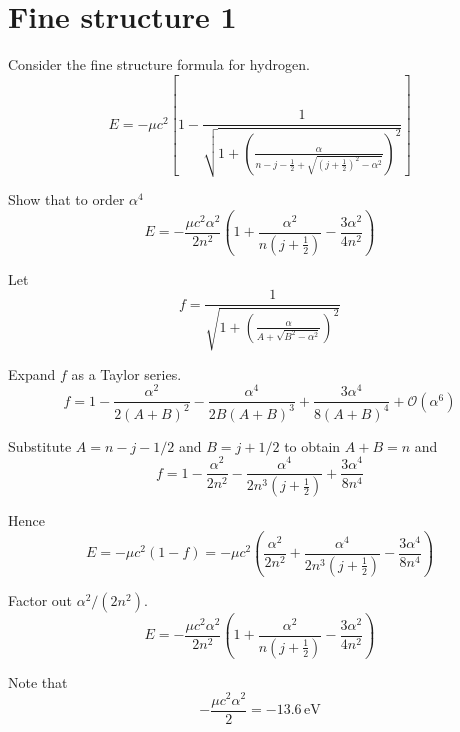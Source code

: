 

\section*{Fine structure 1}

Consider the fine structure formula for hydrogen.
\begin{equation*}
E=-\mu c^2\left[1-\frac{1}{\sqrt{\displaystyle1
+\left(\frac{\alpha}{n-j-\frac{1}{2}+\sqrt{\left(j+\frac{1}{2}\right)^2-\alpha^2}}\right)^2}}\right]
\end{equation*}

Show that to order $\alpha^4$
\begin{equation*}
E=-\frac{\mu c^2\alpha^2}{2n^2}
\left(1+\frac{\alpha^2}{n\left(j+\frac{1}{2}\right)}-\frac{3\alpha^2}{4n^2}\right)
\end{equation*}

Let
\begin{equation*}
f=\frac{1}{\sqrt{\displaystyle1+\left(\frac{\alpha}{A+\sqrt{B^2-\alpha^2}}\right)^2}}
\end{equation*}

Expand $f$ as a Taylor series.
\begin{equation*}
f=1-\frac{\alpha^2}{2(A+B)^2}-\frac{\alpha^4}{2B(A+B)^3}+\frac{3\alpha^4}{8(A+B)^4}+\mathcal O(\alpha^6)
\end{equation*}

Substitute $A=n-j-1/2$ and $B=j+1/2$ to obtain $A+B=n$ and
\begin{equation*}
f=1-\frac{\alpha^2}{2n^2}-\frac{\alpha^4}{2n^3\left(j+\frac{1}{2}\right)}+\frac{3\alpha^4}{8n^4}
\tag{1}
\end{equation*}

Hence
\begin{equation*}
E=-\mu c^2(1-f)=-\mu c^2\left(\frac{\alpha^2}{2n^2}
+\frac{\alpha^4}{2n^3\left(j+\frac{1}{2}\right)}-\frac{3\alpha^4}{8n^4}\right)
\end{equation*}

Factor out $\alpha^2/(2n^2)$.
\begin{equation*}
E=-\frac{\mu c^2\alpha^2}{2n^2}
\left(1+\frac{\alpha^2}{n\left(j+\frac{1}{2}\right)}-\frac{3\alpha^2}{4n^2}\right)
\tag{2}
\end{equation*}

Note that
\begin{equation*}
-\frac{\mu c^2\alpha^2}{2}=-13.6\,\text{eV}
\end{equation*}


